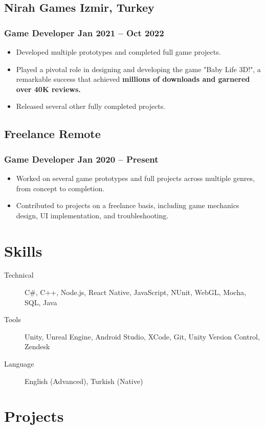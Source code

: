 \documentclass[11pt]{article}
\newcommand{\rside}[1]{
  \hfill {\normalfont\color{accent} #1}%
}
\begin{document}
\subsection{Nirah Games  \rside{Izmir, Turkey}}
\subsubsection{Game Developer \rside{Jan 2021 -- Oct 2022}}
\begin{itemize}
  \item Developed multiple prototypes and completed full game projects.
  \item Played a pivotal role in designing and developing the game "Baby Life 3D!", a remarkable success that achieved \textbf{millions of downloads and garnered over 40K reviews.}
  \item Released several other fully completed projects.
\end{itemize}

\subsection{Freelance \rside{Remote}}
\subsubsection{Game Developer \rside{Jan 2020 -- Present}}
\begin{itemize}
  \item Worked on several game prototypes and full projects across multiple genres, from concept to completion.
  \item Contributed to projects on a freelance basis, including game mechanics design, UI implementation, and troubleshooting.
\end{itemize}
\section{Skills}
\begin{description}
   \item[Technical] C\#, C++, Node.js, React Native, JavaScript, NUnit, WebGL, Mocha, SQL, Java
  \item[Tools] Unity, Unreal Engine, Android Studio, XCode, Git, Unity Version Control, Zendesk
  \item[Language] English (Advanced), Turkish (Native)
\end{description}
\section{Projects}
\end{document}
